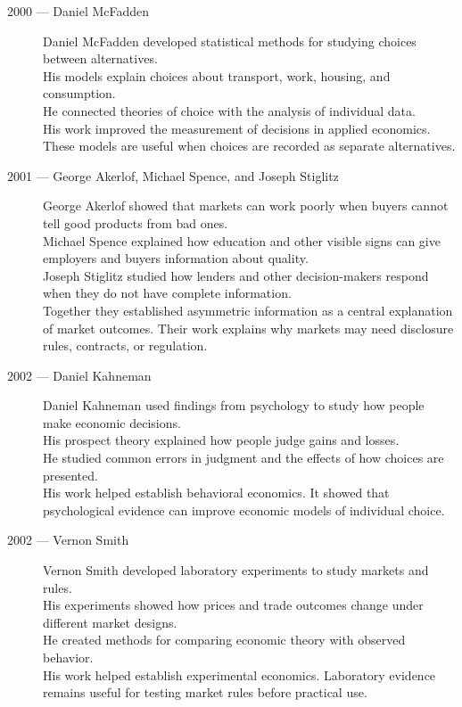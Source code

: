 \documentclass[12pt]{report}
\begin{document}
{\begin{description}
\item[2000 --- Daniel McFadden]
Daniel McFadden developed statistical methods for studying choices between alternatives.\\
His models explain choices about transport, work, housing, and consumption.\\
He connected theories of choice with the analysis of individual data.\\
His work improved the measurement of decisions in applied economics. These models are useful when choices are recorded as separate alternatives.

\item[2001 --- George Akerlof, Michael Spence, and Joseph Stiglitz]
George Akerlof showed that markets can work poorly when buyers cannot tell good products from bad ones.\\
Michael Spence explained how education and other visible signs can give employers and buyers information about quality.\\
Joseph Stiglitz studied how lenders and other decision-makers respond when they do not have complete information.\\
Together they established asymmetric information as a central explanation of market outcomes. Their work explains why markets may need disclosure rules, contracts, or regulation.

\item[2002 --- Daniel Kahneman]
Daniel Kahneman used findings from psychology to study how people make economic decisions.\\
His prospect theory explained how people judge gains and losses.\\
He studied common errors in judgment and the effects of how choices are presented.\\
His work helped establish behavioral economics. It showed that psychological evidence can improve economic models of individual choice.

\item[2002 --- Vernon Smith]
Vernon Smith developed laboratory experiments to study markets and rules.\\
His experiments showed how prices and trade outcomes change under different market designs.\\
He created methods for comparing economic theory with observed behavior.\\
His work helped establish experimental economics. Laboratory evidence remains useful for testing market rules before practical use.


\end{description}}
\end{document}
